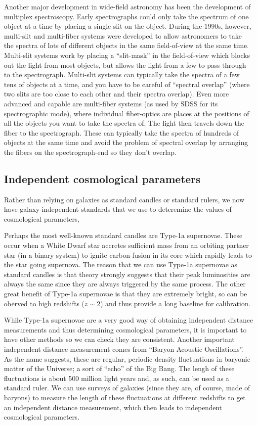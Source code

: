 \documentclass[11pt]{article}
\begin{document}
Another major development in wide-field astronomy has been the
development of multiplex spectroscopy. Early spectrographs could only
take the spectrum of one object at a time by placing a single slit on
the object. During the 1990s, however, multi-slit and multi-fiber
systems were developed to allow astronomers to take the spectra of
lots of different objects in the same field-of-view at the same
time. Multi-slit systems work by placing a ``slit-mask'' in the
field-of-view which blocks out the light from most objects, but allows
the light from a few to pass through to the spectrograph. Multi-slit
systems can typically take the spectra of a few tens of objects at a
time, and you have to be careful of ``spectral overlap'' (where two
slits are too close to each other and their spectra overlap). Even
more advanced and capable are multi-fiber systems (as used by SDSS for
its spectrographic mode), where individual fiber-optics are places at
the positions of all the objects you want to take the spectra of. The
light then travels down the fiber to the spectrograph. These can
typically take the spectra of hundreds of objects at the same time and
avoid the problem of spectral overlap by arranging the fibers on the
spectrograph-end so they don't overlap.

\subsection{Independent cosmological parameters}
Rather than relying on galaxies as standard candles or standard
rulers, we now have galaxy-independent standards that we use to
deteremine the values of cosmological parameters,

Perhaps the most well-known standard candles are Type-1a
supernovae. These occur when a White Dwarf star accretes sufficient
mass from an orbiting partner star (in a binary system) to ignite
carbon-fusion in its core which rapidly leads to the star going
supernova. The reason that we can use Type-1a supernovae as standard
candles is that theory strongly suggests that their peak luminosities
are always the same since they are always triggered by the same
process. The other great benefit of Type-1a supernovae is that they
are extremely bright, so can be oberved to high redshifts ($z\sim2$)
and thus provide a long baseline for calibration.

While Type-1a supernovae are a very good way of obtaining independent
distance measurements and thus determining cosmological parameters, it
is important to have other methods so we can check they are
consistent. Another important independent distance measurement comes
from ``Baryon Acoustic Oscillations''. As the name suggests, these are
regular, periodic density fluctuations in baryonic matter of the
Universe; a sort of ``echo'' of the Big Bang. The lengh of these
fluctuations is about 500 million light years and, as such, can be
used as a standard ruler. We can use surveys of galaxies (since they
are, of course, made of baryons) to measure the length of these
fluctuations at different redshifts to get an independent distance
measurement, which then leads to independent cosmological parameters.
\end{document}
